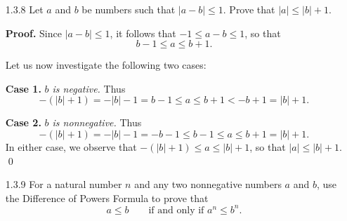 \begin{enumerate}
      \textbf{Proof.} Let $a$ and $b$ be real numbers. By the Triangle
      Inequality, we have that
      $$|a| = |(a + b) + (-b)| \le |a + b| + |-b|,$$
      so that
      \begin{equation}
         |a| - |b| = |a| - |-b| \le |a + b|, \label{1_3_7_1}
      \end{equation}
      and by multiplying inequality \eqref{1_3_7_1} by $-1$, we have that
      $$-|a + b| \le |b| - |a|,$$
      and interchanging $a$ and $b$ in inequality \eqref{1_3_7_1} will also give 
      us
      $$|b| - |a| \le |a + b|,$$
      so that
      $$-|a + b| \le |b| - |a| \le |a + b|.$$
      That is,
      \begin{equation}
         ||a| - |b|| = ||b| - |a|| \le |a + b|. \label{1_3_7_2}
      \end{equation}
      Finally we obtain the inequality $||a| - |b|| \le |a - b|$ by replacing
      $b$ with $-b$ in inequality \eqref{1_3_7_2}. \qed
   
   \item[1.3.8]   Let $a$ and $b$ be numbers such that $|a - b| \le 1$. Prove
                  that $|a| \le |b| + 1$.

      \textbf{Proof.} Since $|a - b| \le 1$, it follows that
      $-1 \le a - b \le 1$, so that
      $$b - 1 \le a \le b + 1.$$

      Let us now investigate the following two cases:

      \textbf{Case 1.} \textit{$b$ is negative.} Thus
      $$-(|b| + 1) = -|b| - 1 = b - 1 \le a \le b + 1 < -b + 1 = |b| + 1.$$

      \textbf{Case 2.} \textit{$b$ is nonnegative.} Thus
      $$-(|b| + 1) = -|b| - 1 = -b - 1 \le b - 1 \le a \le b + 1 = |b| + 1.$$
      In either case, we observe that $-(|b| + 1) \le a \le |b| + 1$, so that
      $|a| \le |b| + 1$. \qed
   \item[1.3.9]   For a natural number $n$ and any two nonnegative numbers $a$
                  and $b$, use the Difference of Powers Formula to prove that
                  $$a \le b \qquad \text{if and only if }a^n \le b^n.$$


\end{enumerate}
